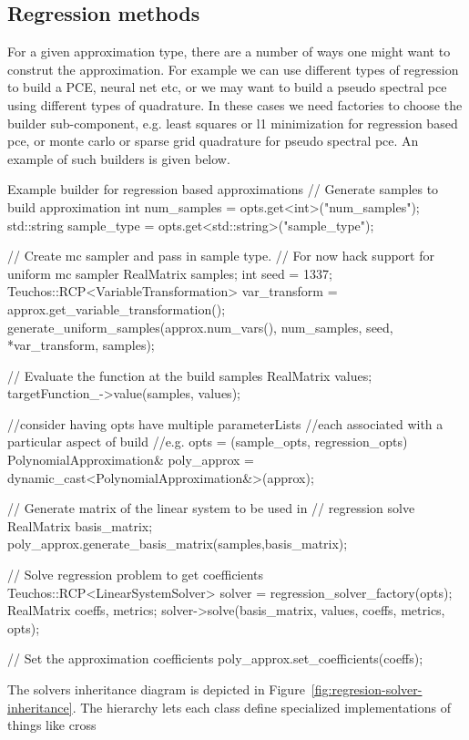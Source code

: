\documentclass[dakotalogo]{dakota-article}
\begin{document}
\subsection{Regression methods}
For a given approximation type, there are a number of ways one might want
to construt the approximation. For example we can use different types
of regression to build a PCE, neural net etc, or we may want to build
a pseudo spectral pce using different types of quadrature. In these
cases we need factories to choose the builder sub-component,
e.g. least squares or l1 minimization for regression based pce, or
monte carlo or sparse grid quadrature for pseudo spectral pce.
An example of such builders is given below.
\begin{codelisting}[]{Example builder for regression based
    approximations}
  // Generate samples to build approximation
  int num_samples = opts.get<int>("num_samples");
  std::string sample_type = opts.get<std::string>("sample_type");

  // Create mc sampler and pass in sample type.
  // For now hack support for uniform mc sampler
  RealMatrix samples;
  int seed = 1337;
  Teuchos::RCP<VariableTransformation> var_transform =
    approx.get_variable_transformation();
  generate_uniform_samples(approx.num_vars(), num_samples, seed,
			   *var_transform, samples);
    
  // Evaluate the function at the build samples
  RealMatrix values;
  targetFunction_->value(samples, values);
    
  //\todo consider having opts have multiple parameterLists
  //each associated with a particular aspect of build
  //e.g. opts = (sample_opts, regression_opts)
  PolynomialApproximation& poly_approx = 
    dynamic_cast<PolynomialApproximation&>(approx);
    
  // Generate matrix of the linear system to be used in
  // regression solve
  RealMatrix basis_matrix;
  poly_approx.generate_basis_matrix(samples,basis_matrix);
    
  // Solve regression problem to get coefficients
  Teuchos::RCP<LinearSystemSolver> solver =
    regression_solver_factory(opts);
  RealMatrix coeffs, metrics;
  solver->solve(basis_matrix, values, coeffs, metrics, opts);
  
  // Set the approximation coefficients
  poly_approx.set_coefficients(coeffs);
\end{codelisting}
The solvers inheritance diagram is depicted in
Figure~\ref{fig:regresion-solver-inheritance}. The hierarchy lets each
class define specialized implementations of things like cross
\end{document}
